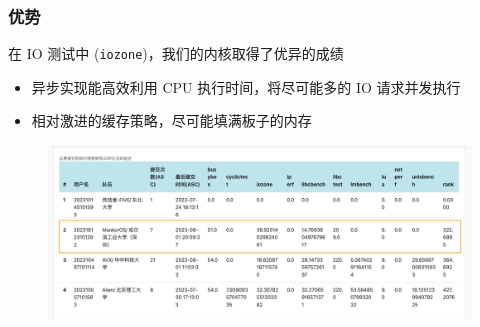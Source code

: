 \begin{frame}
    \frametitle{优势}

    在 IO 测试中 (\texttt{iozone})，我们的内核取得了优异的成绩
    \begin{itemize}
        \item 异步实现能高效利用 CPU 执行时间，将尽可能多的 IO 请求并发执行
        \item 相对激进的缓存策略，尽可能填满板子的内存
    \end{itemize}

    \begin{figure}
        \includegraphics[width=.75\textwidth]{assets/leaderboard-final1.png}
    \end{figure}
\end{frame}



